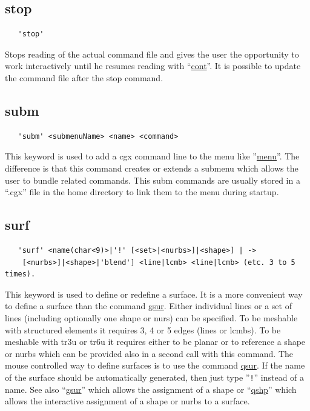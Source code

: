\documentclass{article}
\providecommand{\htmlref}[2]{\hyperref[#2]{#1}}
\begin{document}
\subsection{\label{stop}stop}
\begin{verbatim}
   'stop'
\end{verbatim}
Stops reading of the actual command file and gives the user the opportunity to work interactively until he resumes reading with ``\htmlref{cont}{cont}''. It is possible to update the command file after the stop command.

\subsection{\label{subm}subm}
\begin{verbatim}
   'subm' <submenuName> <name> <command>
\end{verbatim}
This keyword is used to add a cgx command line to the menu like ''\htmlref{menu}{menu}''. The difference is that this command creates or extends a submenu which allows the user to bundle related commands. This subm commands are usually stored in a ``.cgx'' file in the home directory to link them to the menu during startup. 

\subsection{\label{surf}surf}
\begin{verbatim}
   'surf' <name(char<9)>|'!' [<set>|<nurbs>]|<shape>] | ->
    [<nurbs>]|<shape>|'blend'] <line|lcmb> <line|lcmb> (etc. 3 to 5 times). 
\end{verbatim}
This keyword is used to define or redefine a surface. It is a more convenient way to define a surface than the command \htmlref{gsur}{gsur}. Either individual lines or a set of lines (including optionally one shape or nurs) can be specified. To be meshable with structured elements it requires 3, 4 or 5 edges (lines or lcmbs). To be meshable with tr3u or tr6u it requires either to be planar or to reference a shape or nurbs which can be provided also in a second call with this command. The mouse controlled way to define surfaces is to use the command \htmlref{qsur}{qsur}. 
If the name of the surface should be automatically generated, then just type ''\verb_!_'' instead of a name. See also ``\htmlref{gsur}{gsur}'' which allows the assignment of a shape or ``\htmlref{qshp}{qshp}'' which allows the interactive assignment of a shape or nurbs to a surface.
\end{document}

